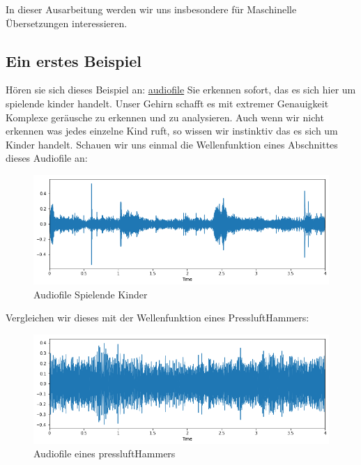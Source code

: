 \documentclass{thesisclass}
\begin{document}
In dieser Ausarbeitung werden wir uns insbesondere für Maschinelle Übersetzungen interessieren.

\subsection{Ein erstes Beispiel}
	Hören sie sich dieses Beispiel an: \hyperlink{https://www.audioblocks.com/stock-audio/playground-children-playing.html}{audiofile}\newline
	Sie erkennen sofort, das es sich hier um spielende kinder handelt.
Unser Gehirn schafft es mit extremer Genauigkeit Komplexe geräusche zu erkennen und zu analysieren. Auch wenn wir nicht erkennen was jedes einzelne Kind ruft, so wissen wir instinktiv das es sich um Kinder handelt.
Schauen wir uns einmal die Wellenfunktion eines Abschnittes dieses Audiofile an:
\begin{figure}[h!]
\includegraphics[width=\textwidth]{images/KidsPlaying.png}
  \caption{Audiofile Spielende Kinder \cite{kidsPlaying}}
  \label{fig:Audiofile Spielende Kinder}
\end{figure}

Vergleichen wir dieses mit der Wellenfunktion eines PressluftHammers:
\begin{figure}[h!]
\includegraphics[width=\textwidth]{images/jackhammer.png}
  \caption{Audiofile eines pressluftHammers \cite{pressluftHammer}}
  \label{fig:Audiofile pressluftHammer}
\end{figure}
\end{document}
